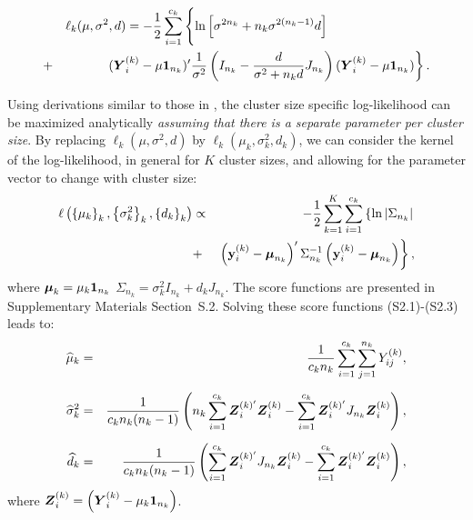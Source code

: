 \documentclass[11pt,a5paper,twoside]{book}
\newcommand{\BY}{\mbox{\boldmath $Y$}}
\newcommand{\BZ}{\mbox{\boldmath $Z$}}
\newcommand{\by}{{\bf y}}
\newcommand{\bmu}{\mbox{\boldmath $\mu$}}
\begin{document}
\begin{equation}
\label{loglikcsk}
\begin{aligned}
&&\ell_k(\mu,\sigma^2,d)=
-\frac{1}{2}\sum_{i=1}^{c_k}
\left\{\ln
\left[\sigma^{2n_k}+n_k\sigma^{2(n_k-1)}d\right]\phantom{\frac{d_m}{\sigma_m^2+nd_m}}
\phantom{-\frac{1}{2}\sum_{i=1}^N} \right.\\
&+&\left.(\BY_{i}^{(k)}-\mu\mathbf{1}_{n_k})'\frac{1}{\sigma^2}\left(I_{n_k}-\frac{d}{\sigma^2+n_kd}J_{n_k}\right)(\BY_{i}^{(k)}-\mu\mathbf{1}_{n_k})\right\}.
\end{aligned}
\end{equation}


Using derivations similar to those in \cite{Iddi2011}, the cluster size specific log-likelihood can be maximized analytically {\em assuming that there is a separate parameter per cluster size}. By replacing $\ell_k(\mu,\sigma^2,d)$ by
$\ell_k(\mu_k,\sigma^2_k,d_k)$, we can consider the kernel of the log-likelihood, in general for $K$ cluster sizes, and allowing for the parameter vector to change with cluster size:
\begin{equation}
   \label{jloglik}
\begin{aligned}
\ell\left(\left\{\mu_k\right\}_k,\left\{\sigma_k^2\right\}_k,\left\{d_k\right\}_k\right)  &\propto& - \frac{1}{2}\sum_{k=1}^K\sum_{i=1}^{c_k} \left\{\ln|\Sigma_{n_k}| \right. \\ 
&+& \left. \left(\by_{i}^{(k)}-\bmu_{n_k}\right)'\Sigma_{n_k}^{-1} \left(\by_{i}^{(k)}-\bmu_{n_k}\right) \right\},
\end{aligned}
\end{equation}
where $\bmu_k=\mu_k\mathbf{1}_{n_k}$  $\Sigma_{n_k}=\sigma_k^2 I_{n_k}+ d_k J_{n_k}$. The score functions are presented in Supplementary Materials Section~S.2.
Solving these score functions (S2.1)-(S2.3)
leads to:
\begin{eqnarray}
\label{muk}
\widehat{\mu}_k&=&\frac{1}{c_kn_k}\sum_{i=1}^{c_k}\sum_{j=1}^{n_k}Y_{ij}^{(k)},\\[2mm]
\widehat{\sigma}^2_k&=&\frac{1}{c_kn_k(n_k-1)}\left(
n_k\sum_{i=1}^{c_k}\BZ_{i}^{(k)'}\BZ_{i}^{(k)}-\sum_{i=1}^{c_k}\BZ_{i}^{(k)'}J_{n_k}\BZ_{i}^{(k)}
\right),\label{sigmak}\\[2mm]
\widehat{d}_k&=&
\frac{1}{c_kn_k(n_k-1)}\left(
\sum_{i=1}^{c_k}\BZ_{i}^{(k)'}J_{n_k}\BZ_{i}^{(k)}-\sum_{i=1}^{c_k}\BZ_{i}^{(k)'}\BZ_{i}^{(k)}
\right),\label{dk}
\end{eqnarray}
where $\BZ_{i}^{(k)}=\left(\BY_{i}^{(k)}-\mu_k\mathbf{1}_{n_k}\right)$.
\end{document}
